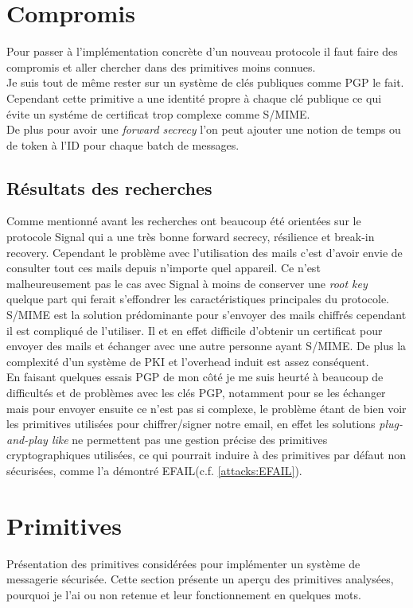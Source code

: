 \section{Compromis}
Pour passer à l'implémentation concrète d'un nouveau protocole il faut faire des compromis et aller chercher dans des primitives moins connues.\\
Je suis tout de même rester sur un système de clés publiques comme PGP le fait. Cependant cette primitive a une identité propre à chaque clé publique ce qui évite un systéme de certificat trop complexe comme S/MIME.\\
De plus pour avoir une \textit{forward secrecy} l'on peut ajouter une notion de temps ou de token à l'ID pour chaque batch de messages.
\subsection{Résultats des recherches}
Comme mentionné avant les recherches ont beaucoup été orientées sur le protocole Signal qui a une très bonne forward secrecy, résilience et break-in recovery. Cependant le problème avec l'utilisation des mails c'est d'avoir envie de consulter tout ces mails depuis n'importe quel appareil. Ce n'est malheureusement pas le cas avec Signal à moins de conserver une \textit{root key} quelque part qui ferait s'effondrer les caractéristiques principales du protocole.\\
S/MIME est la solution prédominante pour s'envoyer des mails chiffrés cependant il est compliqué de l'utiliser. Il et en effet difficile d'obtenir un certificat pour envoyer des mails et échanger avec une autre personne ayant S/MIME. De plus la complexité d'un système de PKI et l'overhead induit est assez conséquent.\\
En faisant quelques essais PGP de mon côté je me suis heurté à beaucoup de difficultés et de problèmes avec les clés PGP, notamment pour se les échanger mais pour envoyer ensuite ce n'est pas si complexe, le problème étant de bien voir les primitives utilisées pour chiffrer/signer notre email, en effet les solutions \textit{plug-and-play like} ne permettent pas une gestion précise des primitives cryptographiques utilisées, ce qui pourrait induire à des primitives par défaut non sécurisées, comme l'a démontré EFAIL(c.f. \ref{attacks:EFAIL}).
\section{Primitives}
Présentation des primitives considérées pour implémenter un système de messagerie sécurisée. Cette section présente un aperçu des primitives analysées, pourquoi je l'ai ou non retenue et leur fonctionnement en quelques mots.
